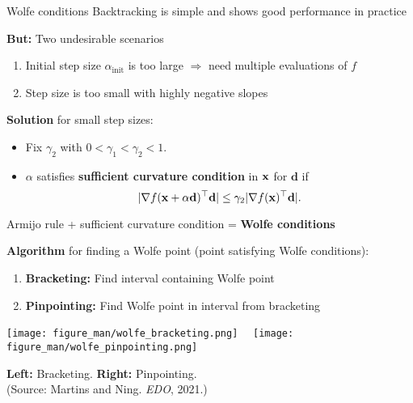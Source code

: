\documentclass[11pt,compress,t,notes=noshow, xcolor=table]{beamer}
\begin{document}
	\begin{vbframe}{Wolfe conditions}
        Backtracking is simple and shows good performance in practice

        \medskip

        \textbf{But:} Two undesirable scenarios
        \begin{enumerate}
            \item Initial step size $\alpha_{\text{init}}$ is too large $\Rightarrow$ need multiple evaluations of $f$
            \item Step size is too small with highly negative slopes
        \end{enumerate}

        \medskip

        \textbf{Solution} for small step sizes:
        \begin{itemize}
            \item Fix $\gamma_2$ with $0 < \gamma_1 < \gamma_2 < 1$.
            \item $\alpha$ satisfies \textbf{sufficient curvature condition} in $\mathbf{x}$ for $\mathbf{d}$ if
                \begin{equation*}
		              | \nabla f(\mathbf{x} + \alpha \mathbf{d})^\top \mathbf{d} | \leq \gamma_2 | \nabla f(\mathbf{x})^\top \mathbf{d} |.
                \end{equation*}
        \end{itemize}
        
        \begin{center}
            \begin{framed}
                Armijo rule + sufficient curvature condition = \textbf{Wolfe conditions}
            \end{framed}
        \end{center}

        \framebreak

        \textbf{Algorithm} for finding a Wolfe point (point satisfying Wolfe conditions):
        \begin{enumerate}
            \item \textbf{Bracketing:} Find interval containing Wolfe point
            \item \textbf{Pinpointing:} Find Wolfe point in interval from bracketing
        \end{enumerate}

        \begin{center}
            \texttt{[image: figure\_man/wolfe\_bracketing.png]}~~
            \texttt{[image: figure\_man/wolfe\_pinpointing.png]} \\
            
            \medskip
            
            {\footnotesize \textbf{Left:} Bracketing.
                \textbf{Right:} Pinpointing. \\
                (Source: Martins and Ning. \textit{EDO}, 2021.)}
        \end{center}
	\end{vbframe}
\end{document}
